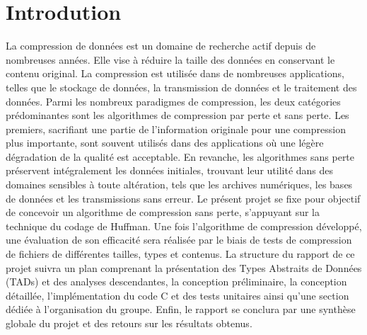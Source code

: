 \section{Introdution}
	La compression de données est un domaine de recherche actif depuis de nombreuses années. Elle vise à réduire la taille des données en conservant le contenu original. La compression est utilisée dans de nombreuses applications, telles que le stockage de données, la transmission de données et le traitement des données.
	\bigbreak
	Parmi les nombreux paradigmes de compression, les deux catégories prédominantes sont les algorithmes de compression par perte et sans perte. Les premiers, sacrifiant une partie de l'information originale pour une compression plus importante, sont souvent utilisés dans des applications où une légère dégradation de la qualité est acceptable. En revanche, les algorithmes sans perte préservent intégralement les données initiales, trouvant leur utilité dans des domaines sensibles à toute altération, tels que les archives numériques, les bases de données et les transmissions sans erreur.
	\bigbreak
	Le présent projet se fixe pour objectif de concevoir un algorithme de compression sans perte, s'appuyant sur la technique du codage de Huffman. Une fois l'algorithme de compression développé, une évaluation de son efficacité sera réalisée par le biais de tests de compression de fichiers de différentes tailles, types et contenus.
	\bigbreak
	La structure du rapport de ce projet suivra un plan comprenant la présentation des Types Abstraits de Données (TADs) et des analyses descendantes, la conception préliminaire, la conception détaillée, l'implémentation du code C et des tests unitaires ainsi qu'une section dédiée à l'organisation du groupe. Enfin, le rapport se conclura par une synthèse globale du projet et des retours sur les résultats obtenus.
